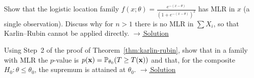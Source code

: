 \documentclass[main.tex]{subfiles}
\begin{document}
\begin{exercise}\label{exr:14-3}
Show that the logistic location family $f(x;\theta)=\frac{e^{-(x-\theta)}}{(1+e^{-(x-\theta)})^2}$ has MLR in $x$ (a single observation). Discuss why for $n>1$ there is no MLR in $\sum X_i$, so that Karlin--Rubin cannot be applied directly.
\hfill\hyperref[coz:14-3]{\footnotesize$\rightarrow$\,Solution}
\end{exercise}

\begin{exercise}\label{exr:14-4}
Using Step~2 of the proof of Theorem~\ref{thm:karlin-rubin}, show that in a family with MLR the $p$-value is $p(\mathbf{x})=\mathbb{P}_{\theta_0}(T\ge T(\mathbf{x}))$ and that, for the composite $H_0:\theta\le\theta_0$, the supremum is attained at $\theta_0$.
\hfill\hyperref[coz:14-4]{\footnotesize$\rightarrow$\,Solution}
\end{exercise}

\end{document}
